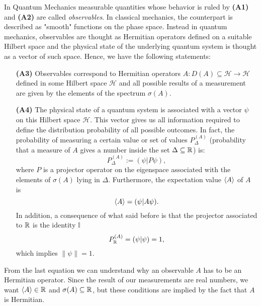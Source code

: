  In Quantum Mechanics measurable quantities whose behavior is ruled by \textbf{(A1)} and \textbf{(A2)} are called \textit{observables}. In classical mechanics, the counterpart is described as "smooth" functions on the phase space. Instead in quantum mechanics, observables are thought as Hermitian operators defined on a suitable Hilbert space and the physical state of the underlying quantum system is thought as a vector of such space. Hence, we have the following statements:
 \begin{itemize}
 	\item[\textbf{(A3)}] Observables correspond to Hermitian operators $A:D(A)\subseteq\mathcal{H}\to\mathcal{H}$ defined in some Hilbert space $\mathcal{H}$ and all possible results of a measurement are given by the elements of the spectrum $\sigma(A)$.%
 	\item[\textbf{(A4)}] The physical state of a quantum system is associated with a vector $\psi$ on this Hilbert space $\mathcal{H}$. This vector gives us all information required to define the distribution probability of all possible outcomes. In fact, the probability of measuring a certain value or set of values $P_\Delta^{(A)}$ (probability that a measure of $A$ gives a number inside the set $\Delta\subseteq{\mathbb R}$) is:
 	\begin{equation}
 		P_\Delta^{(A)}:=(\psi|P\psi),
 		\label{eq:prob_proj}
 	\end{equation} 
 	where $P$ is a projector operator on the eigenspace associated with the elements of $\sigma(A)$ lying in $\Delta$. Furthermore, the expectation value $\braket{A} $ of $A$ is
 	\begin{equation}
 		\braket{A}=(\psi|A\psi).
 	\end{equation} 
 	In addition, a consequence of what said before is that the projector associated to ${\mathbb R}$ is the identity $\mathbb{I}$
 	\begin{equation}
 		P^{(A)}_{\mathbb R}=(\psi|\psi)=1,
 	\end{equation}
 	which implies $\|\psi\|=1$.
 \end{itemize}
 
 \begin{rem}
 	From the last equation we can understand why an observable $A$ has to be an Hermitian operator. Since the result of our measurements are real numbers, we want $\braket{A}\in{\mathbb R}$ and $\sigma(A)\subseteq{\mathbb R}$, but these conditions are implied by the fact that $A$ is Hermitian.
 \end{rem} 
  
